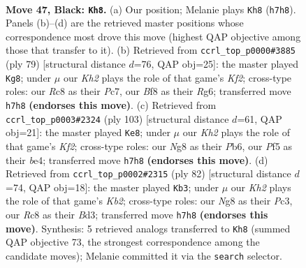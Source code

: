 \documentclass[11pt]{article}
\begin{document}
\clearpage

\begin{figure}[p]\centering
\begin{subfigure}{0.46\textwidth}\centering
\resizebox{\linewidth}{!}{%
\newchessgame
\chessboard[
  setfen={2r2bn1/p5pk/P1b5/1p3p1p/1P3P2/1R2P1P1/7K/RNB5 b - - 9 47},
  showmover=false,
  pgfstyle=straightmove, color=movearrow, markmove={h7-h8}
]}
\caption{}
\end{subfigure}\hfill
\begin{subfigure}{0.46\textwidth}\centering
\resizebox{\linewidth}{!}{%
\newchessgame
\chessboard[
  setfen={8/1pp2kp1/2pb2r1/8/p7/2PK1N1P/PP3RP1/8 b - - 7 40},
  showmover=false,
  pgfstyle=straightmove, color=movearrow, markmove={f7-g8}
]}
\caption{}
\end{subfigure}
\\[4pt]
\begin{subfigure}{0.46\textwidth}\centering
\resizebox{\linewidth}{!}{%
\newchessgame
\chessboard[
  setfen={3r1b2/5k2/1p2p2p/p3p1p1/4B1P1/P1P1R2P/1P3P2/4K3 b - - 26 52},
  showmover=false,
  pgfstyle=straightmove, color=movearrow, markmove={f7-e8}
]}
\caption{}
\end{subfigure}\hfill
\begin{subfigure}{0.46\textwidth}\centering
\resizebox{\linewidth}{!}{%
\newchessgame
\chessboard[
  setfen={3r4/1p1r1p1b/3p1Ppk/1P5p/4R2P/2PB2R1/1K6/8 w - - 3 42},
  showmover=false,
  pgfstyle=straightmove, color=movearrow, markmove={b2-b3}
]}
\caption{}
\end{subfigure}
\caption{\textbf{Move 47, Black: \texttt{Kh8}.} (a) Our position; Melanie plays \texttt{Kh8} (\texttt{h7h8}). Panels (b)--(d) are the retrieved master positions whose correspondence most drove this move (highest QAP objective among those that transfer to it). (b) Retrieved from \texttt{ccrl\_top\_p0000\#3885} (ply 79) [structural distance $d$=76, QAP obj=25]: the master played \texttt{Kg8}; under $\mu$ our \emph{Kh2} plays the role of that game's \emph{Kf2}; cross-type roles: our \emph{R}c8 as their \emph{P}c7, our \emph{B}f8 as their \emph{R}g6; transferred move \texttt{h7h8} \textbf{(endorses this move)}. (c) Retrieved from \texttt{ccrl\_top\_p0003\#2324} (ply 103) [structural distance $d$=61, QAP obj=21]: the master played \texttt{Ke8}; under $\mu$ our \emph{Kh2} plays the role of that game's \emph{Kf2}; cross-type roles: our \emph{N}g8 as their \emph{P}b6, our \emph{P}f5 as their \emph{b}e4; transferred move \texttt{h7h8} \textbf{(endorses this move)}. (d) Retrieved from \texttt{ccrl\_top\_p0002\#2315} (ply 82) [structural distance $d$=74, QAP obj=18]: the master played \texttt{Kb3}; under $\mu$ our \emph{Kh2} plays the role of that game's \emph{Kb2}; cross-type roles: our \emph{N}g8 as their \emph{P}c3, our \emph{R}c8 as their \emph{B}d3; transferred move \texttt{h7h8} \textbf{(endorses this move)}. Synthesis: 5 retrieved analogs transferred to \texttt{Kh8} (summed QAP objective 73, the strongest correspondence among the candidate moves); Melanie committed it via the \texttt{search} selector.}
\label{fig:thought-m93}
\end{figure}
\end{document}

